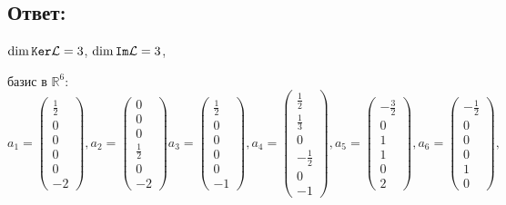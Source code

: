 \documentclass[12pt]{article}
\begin{document}
    \subsection*{Ответ:}
    $\dim \mathtt{Ker} \mathcal{L} = 3$, $\dim \mathtt{Im} \mathcal{L} = 3$,

    \noindent базис в $\mathbb{R}^6$:
    \[
        a_1 = \begin{pmatrix}
                  \frac{1}{2} \\ 0 \\ 0 \\ 0 \\ 0 \\ -2
        \end{pmatrix},
        a_2 = \begin{pmatrix}
                  0 \\ 0 \\ 0 \\ \frac{1}{2} \\ 0 \\ -2
        \end{pmatrix}
        a_3 = \begin{pmatrix}
                  \frac{1}{2} \\ 0 \\ 0 \\ 0 \\ 0 \\ -1
        \end{pmatrix},
        a_4 = \begin{pmatrix}
                  \frac{1}{2} \\ \frac{1}{3} \\ 0 \\ -\frac{1}{2} \\ 0 \\ -1
        \end{pmatrix},
        a_5 = \begin{pmatrix}
                  -\frac{3}{2} \\ 0 \\ 1 \\ 1 \\ 0 \\ 2
        \end{pmatrix},
        a_6 = \begin{pmatrix}
                  -\frac{1}{2} \\ 0 \\ 0 \\ 0 \\ 1 \\ 0
        \end{pmatrix},
    \]
\end{document}
